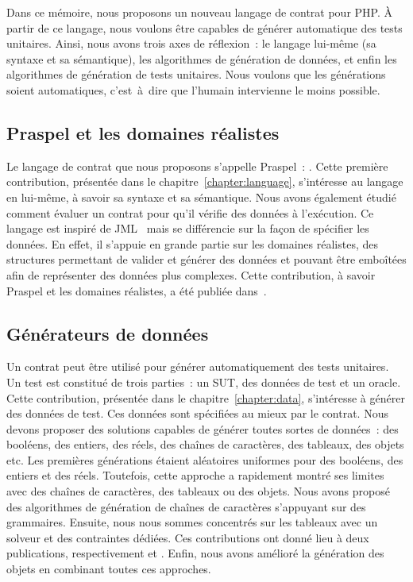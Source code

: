 Dans ce mémoire, nous proposons un nouveau langage de contrat pour PHP. À partir
de ce langage, nous voulons être capables de générer automatique des tests
unitaires. Ainsi, nous avons trois axes de réflexion~: le langage lui-même (sa
syntaxe et sa sémantique), les algorithmes de génération de données, et enfin
les algorithmes de génération de tests unitaires. Nous voulons que les
générations soient automatiques, c'est~à~dire que l'humain intervienne le moins
possible.

\subsection{Praspel et les domaines réalistes}

Le langage de contrat que nous proposons s'appelle {\strong Praspel}~:
. Cette première
contribution, présentée dans le chapitre~\ref{chapter:language}, s'intéresse au
langage en lui-même, à savoir sa syntaxe et sa sémantique. Nous avons également
étudié comment évaluer un contrat pour qu'il vérifie des données à l'exécution.
Ce langage est inspiré de JML~ mais se différencie sur la façon de
spécifier les données. En effet, il s'appuie en grande partie sur les {\strong
domaines réalistes}, des structures permettant de valider et générer des données
et pouvant être emboîtées afin de représenter des données plus complexes. Cette
contribution, à savoir Praspel et les domaines réalistes, a été publiée
dans~.

\subsection{Générateurs de données}

Un contrat peut être utilisé pour générer automatiquement des tests unitaires.
Un test est constitué de trois parties~: un SUT, des données de test et un
oracle. Cette contribution, présentée dans le chapitre~\ref{chapter:data},
s'intéresse à générer des données de test. Ces données sont spécifiées au mieux
par le contrat. Nous devons proposer des solutions capables de générer toutes
sortes de données~: des booléens, des entiers, des réels, des chaînes de
caractères, des tableaux, des objets etc. Les premières générations étaient
aléatoires uniformes pour des booléens, des entiers et des réels. Toutefois,
cette approche a rapidement montré ses limites avec des chaînes de caractères,
des tableaux ou des objets. Nous avons proposé des algorithmes de génération de
chaînes de caractères s'appuyant sur des grammaires. Ensuite, nous nous sommes
concentrés sur les tableaux avec un solveur et des contraintes dédiées. Ces
contributions ont donné lieu à deux publications, respectivement
 et . Enfin, nous avons amélioré la
génération des objets en combinant toutes ces approches.


